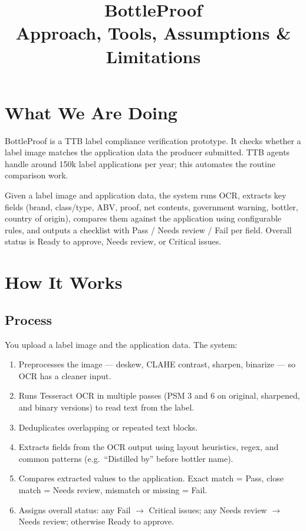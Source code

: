 \documentclass[11pt,a4paper]{article}
\title{BottleProof\\Approach, Tools, Assumptions \& Limitations}
\author{}
\date{}
\begin{document}
\maketitle

\section{What We Are Doing}

BottleProof is a TTB label compliance verification prototype. It checks whether a label image matches the application data the producer submitted. TTB agents handle around 150k label applications per year; this automates the routine comparison work.

Given a label image and application data, the system runs OCR, extracts key fields (brand, class/type, ABV, proof, net contents, government warning, bottler, country of origin), compares them against the application using configurable rules, and outputs a checklist with Pass / Needs review / Fail per field. Overall status is Ready to approve, Needs review, or Critical issues.

\section{How It Works}

\subsection{Process}

You upload a label image and the application data. The system:

\begin{enumerate}
    \item Preprocesses the image --- deskew, CLAHE contrast, sharpen, binarize --- so OCR has a cleaner input.
    \item Runs Tesseract OCR in multiple passes (PSM 3 and 6 on original, sharpened, and binary versions) to read text from the label.
    \item Deduplicates overlapping or repeated text blocks.
    \item Extracts fields from the OCR output using layout heuristics, regex, and common patterns (e.g.\ ``Distilled by'' before bottler name).
    \item Compares extracted values to the application. Exact match = Pass, close match = Needs review, mismatch or missing = Fail.
    \item Assigns overall status: any Fail $\rightarrow$ Critical issues; any Needs review $\rightarrow$ Needs review; otherwise Ready to approve.
\end{enumerate}
\end{document}
